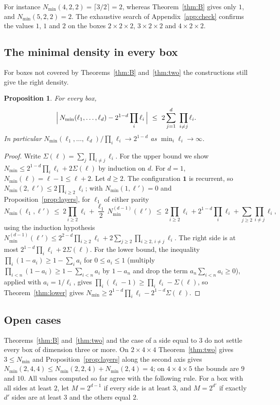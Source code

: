 \documentclass[11pt]{amsart}
\newtheorem{proposition}[theorem]{Proposition}
\theoremstyle{definition}
\newcommand{\one}{\mathbf 1}
\newcommand{\Nmin}{N_{\min}}
\begin{document}
For instance $\Nmin(4,2,2)=\lceil3/2\rceil=2$, whereas Theorem~\ref{thm:B} gives only $1$, and $\Nmin(5,2,2)=2$. The exhaustive search of Appendix~\ref{app:check} confirms the values $1$, $1$ and $2$ on the boxes $2\times2\times2$, $3\times2\times2$ and $4\times2\times2$.

\subsection{The minimal density in every box}
For boxes not covered by Theorems~\ref{thm:B} and~\ref{thm:two} the constructions still give the right density.

\begin{proposition}\label{prop:density}
For every box,
\[
\Bigl|\,\Nmin(\ell_1,\dots,\ell_d)-2^{1-d}\prod_i\ell_i\,\Bigr|\ \le\ 2\sum_{j=1}^d\ \prod_{i\ne j}\ell_i .
\]
In particular $\Nmin(\ell_1,\dots,\ell_d)/\prod_i\ell_i\to2^{1-d}$ as $\min_i\ell_i\to\infty$.
\end{proposition}

\begin{proof}
Write $\Sigma(\ell)=\sum_j\prod_{i\ne j}\ell_i$. For the upper bound we show $\Nmin\le2^{1-d}\prod_i\ell_i+2\Sigma(\ell)$ by induction on $d$. For $d=1$, $\Nmin(\ell)=\ell-1\le\ell+2$. Let $d\ge2$. The configuration $\one$ is recurrent, so $\Nmin(2,\ell')\le2\prod_{i\ge2}\ell_i$; with $\Nmin(1,\ell')=0$ and Proposition~\ref{prop:layers}, for $\ell_1$ of either parity
\[
\Nmin(\ell_1,\ell')\ \le\ 2\prod_{i\ge2}\ell_i+\frac{\ell_1}2\,\Nmin^{(d-1)}(\ell')\ \le\ 2\prod_{i\ge2}\ell_i+2^{1-d}\prod_i\ell_i+\sum_{j\ge2}\prod_{i\ne j}\ell_i,
\]
using the induction hypothesis $\Nmin^{(d-1)}(\ell')\le2^{2-d}\prod_{i\ge2}\ell_i+2\sum_{j\ge2}\prod_{i\ge2,\,i\ne j}\ell_i$. The right side is at most $2^{1-d}\prod_i\ell_i+2\Sigma(\ell)$. For the lower bound, the inequality $\prod_i(1-a_i)\ge1-\sum_ia_i$ for $0\le a_i\le1$ (multiply $\prod_{i<n}(1-a_i)\ge1-\sum_{i<n}a_i$ by $1-a_n$ and drop the term $a_n\sum_{i<n}a_i\ge0$), applied with $a_i=1/\ell_i$, gives $\prod_i(\ell_i-1)\ge\prod_i\ell_i-\Sigma(\ell)$, so Theorem~\ref{thm:lower} gives $\Nmin\ge2^{1-d}\prod_i\ell_i-2^{1-d}\Sigma(\ell)$.
\end{proof}

\subsection{Open cases}
Theorems~\ref{thm:B} and~\ref{thm:two} and the case of a side equal to $3$ do not settle every box of dimension three or more. On $2\times4\times4$ Theorem~\ref{thm:two} gives $3\le\Nmin$ and Proposition~\ref{prop:layers} along the second axis gives $\Nmin(2,4,4)\le\Nmin(2,2,4)+\Nmin(2,4)=4$; on $4\times4\times5$ the bounds are $9$ and $10$. All values computed so far agree with the following rule. For a box with all sides at least $2$, let $M=2^{d-1}$ if every side is at least $3$, and $M=2^{d'}$ if exactly $d'$ sides are at least $3$ and the others equal $2$.
\end{document}
